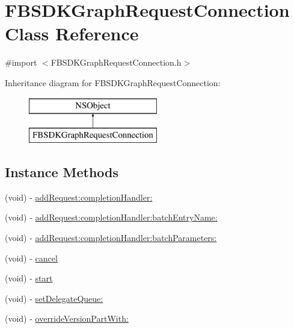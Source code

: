 \hypertarget{interface_f_b_s_d_k_graph_request_connection}{}\section{F\+B\+S\+D\+K\+Graph\+Request\+Connection Class Reference}
\label{interface_f_b_s_d_k_graph_request_connection}


{\ttfamily \#import $<$F\+B\+S\+D\+K\+Graph\+Request\+Connection.\+h$>$}

Inheritance diagram for F\+B\+S\+D\+K\+Graph\+Request\+Connection\+:\begin{figure}[H]
\begin{center}
\leavevmode
\includegraphics[height=2.000000cm]{interface_f_b_s_d_k_graph_request_connection}
\end{center}
\end{figure}
\subsection*{Instance Methods}
\begin{DoxyCompactItemize}
\item 
(void) -\/ \hyperlink{interface_f_b_s_d_k_graph_request_connection_a78390d62d921d5b8a9019b1122b9bfec}{add\+Request\+:completion\+Handler\+:}
\item 
(void) -\/ \hyperlink{interface_f_b_s_d_k_graph_request_connection_a546ecc3c0023510c0497308a5d7a20ea}{add\+Request\+:completion\+Handler\+:batch\+Entry\+Name\+:}
\item 
(void) -\/ \hyperlink{interface_f_b_s_d_k_graph_request_connection_a8c7f18d5ddc46547234e82f92048cdc0}{add\+Request\+:completion\+Handler\+:batch\+Parameters\+:}
\item 
(void) -\/ \hyperlink{interface_f_b_s_d_k_graph_request_connection_ac837293e8959c4aa67fb691c8ac6fbb7}{cancel}
\item 
(void) -\/ \hyperlink{interface_f_b_s_d_k_graph_request_connection_a9801b9b73d40cd2768e4bc9ba85f6686}{start}
\item 
(void) -\/ \hyperlink{interface_f_b_s_d_k_graph_request_connection_a9ac67d71dfa9612c653c34376f7a3196}{set\+Delegate\+Queue\+:}
\item 
(void) -\/ \hyperlink{interface_f_b_s_d_k_graph_request_connection_ade83903924f937d9685b757c1285590f}{override\+Version\+Part\+With\+:}
\end{DoxyCompactItemize}
